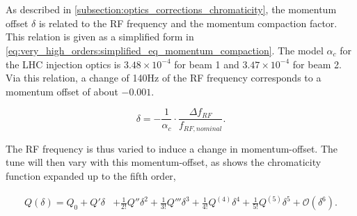 \section{}
\label{section:very_hgih_orders:chromaticity}

As described in \cref{subsection:optics_corrections_chromaticity}, the momentum offset $\delta$ is
related to the RF frequency and the momentum compaction factor. This relation is given as a
simplified form in \cref{eq:very_high_orders:simplified_eq_momentum_compaction}. 
The model $\alpha_c$ for the LHC injection optics is $3.48 \times 10^{-4}$ for beam 1 and $3.47
\times 10^{-4}$ for beam 2. Via this relation, a change of 140Hz of the RF frequency corresponds to
a momentum offset of about $-0.001$.

\begin{equation}
    \delta = -\frac{1}{\alpha_c} \cdot \frac{\Delta f_{RF}}{f_{RF,nominal}}.
    \label{eq:very_high_orders:simplified_eq_momentum_compaction}
\end{equation}

The RF frequency is thus varied to induce a change in momentum-offset. The tune will then vary with
this momentum-offset, as shows the chromaticity function expanded up to the fifth order,

\begin{equation}
  \begin{aligned}
    Q(\delta) = Q_0 + Q'\delta &+ \frac{1}{2!}Q''\delta^2 + \frac{1}{3!}Q'''\delta^3
                                + \frac{1}{4!}Q^{(4)}\delta^4  + \frac{1}{5!}Q^{(5)}\delta^5
                                + \mathcal{O}(\delta^6).
  \end{aligned}
  \label{eq:very_high_orders:chromaticity_high_orders}
\end{equation}






